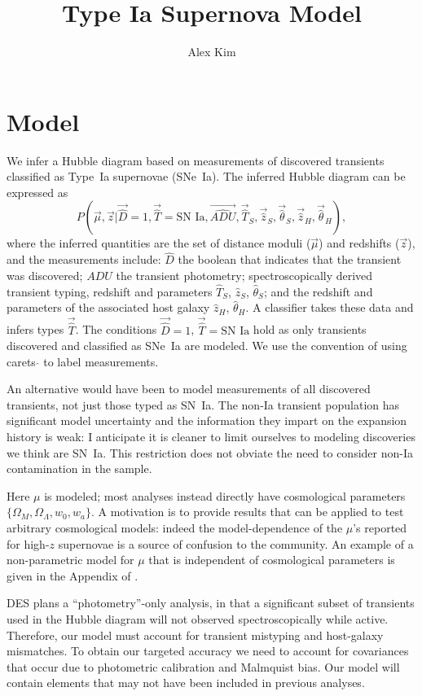 \documentclass[preprint]{aastex}
\begin{document}
\title{Type Ia Supernova Model}
\author{Alex Kim}

\section{Model}
We infer a Hubble diagram based on measurements of discovered transients
classified as Type~Ia supernovae (SNe~Ia).  The inferred Hubble diagram can be
expressed as
\begin{equation}
P(\vec{\mu},\vec{z} |  \vec{\hat{D}}=1, \vec{\hat{T}}=\text{SN~Ia}, \vec{\hat{ADU}}, \vec{\hat{T}}_S,\vec{\hat{z}}_S,
\vec{\hat{\theta}}_S,\vec{\hat{z}}_H,\vec{\hat{\theta}}_H),
\label{hd:eqn}
\end{equation}
where the inferred quantities are the set of distance moduli ($\vec{\mu}$)
and redshifts ($\vec{z}$), and 
the measurements include: $\hat{D}$ the boolean that indicates that
the transient was discovered; $\hat{ADU}$ the transient photometry;
spectroscopically derived transient
typing, redshift and parameters $\hat{T}_S$, $\hat{z}_S$, $\hat{\theta}_S$;
and the redshift and parameters of the associated host galaxy $\hat{z}_{H}$, $\hat{\theta}_H$.
A classifier takes these data and infers types $\vec{\hat{T}}$.
The conditions $\vec{\hat{D}}=1$, $\vec{\hat{T}}=\text{SN~Ia}$ hold as only transients
discovered and classified as SNe~Ia are modeled.  We use the convention of using carets $\hat{}$
to  label measurements.

An alternative would have been to
model measurements of all discovered transients, not just those typed as SN~Ia. 
The non-Ia transient population has significant model uncertainty and the information they impart on the expansion history is weak:  I anticipate it is cleaner to limit ourselves to
modeling discoveries we think are SN~Ia.  This restriction does not obviate the need
to consider non-Ia contamination in the sample.

Here $\mu$ is modeled; most analyses instead
directly have cosmological parameters $\{\Omega_M, \Omega_\Lambda, w_0, w_a\}$.
A motivation is to provide results that can be applied to test arbitrary cosmological models:
indeed the model-dependence of the $\mu$'s reported for high-$z$ supernovae 
\citep[e.g.][]{2012ApJ...746...85S} is a source of confusion to the community.
An example of a non-parametric model for $\mu$ that is independent of cosmological
parameters is given in the Appendix of
\citet{2013ApJ...764..116W}.

DES plans a ``photometry''-only analysis, in that a significant subset of transients used
in the Hubble diagram will not observed spectroscopically while active.  Therefore,
our model must account for transient mistyping and host-galaxy mismatches.  To obtain
our targeted
accuracy we need to account for covariances that occur due to photometric
calibration and Malmquist bias.  Our model will contain elements that may not
have been included in previous analyses. 
\end{document}

